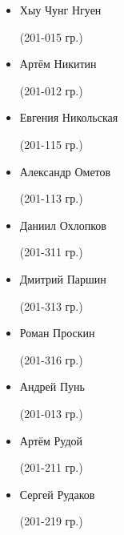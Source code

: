 \begin{multicols}{2}
\begin{small}
\begin{itemize}[leftmargin=0.5em]
	\item[] Хыу Чунг Нгуен\begin{tiny} (201-015 гр.)\end{tiny} %
	\item[] Артём Никитин\begin{tiny} (201-012 гр.)\end{tiny}
	\item[] Евгения Никольская\begin{tiny} (201-115 гр.)\end{tiny} %

	\item[] Александр Ометов\begin{tiny} (201-113 гр.)\end{tiny} %
	\item[] Даниил Охлопков\begin{tiny} (201-311 гр.)\end{tiny}

	\item[] Дмитрий Паршин\begin{tiny} (201-313 гр.)\end{tiny} %
	\item[] Роман Проскин\begin{tiny} (201-316 гр.)\end{tiny} %
	\item[] Андрей Пунь\begin{tiny} (201-013 гр.)\end{tiny}

	\item[] Артём Рудой\begin{tiny} (201-211 гр.)\end{tiny} %
	\item[] Сергей Рудаков\begin{tiny} (201-219 гр.)\end{tiny} %


\end{itemize}
\end{small}
\end{multicols}
